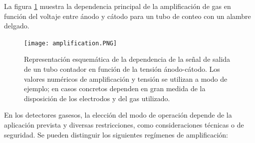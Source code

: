 \documentclass{article}
\begin{document}
\noindent La figura \ref{fig:amplification} muestra la dependencia principal de la amplificación de gas en función del voltaje entre ánodo y cátodo para un tubo de conteo con un alambre delgado. 


\begin{figure}[H]
    \centering
    \texttt{[image: amplification.PNG]}
    \caption{Representación esquemática de la dependencia de la
    señal de salida de un tubo contador en función de la tensión ánodo-cátodo. Los valores numéricos de amplificación y tensión se utilizan a modo de ejemplo; en casos concretos dependen en gran medida de la disposición de los electrodos y del gas utilizado. }
    \label{fig:amplification}
\end{figure}

\noindent En los detectores gasesos, la elección del modo de operación depende de la aplicación prevista y diversas restricciones, como consideraciones técnicas o de seguridad. Se pueden distinguir los siguientes regímenes de amplificación: 
\end{document}
